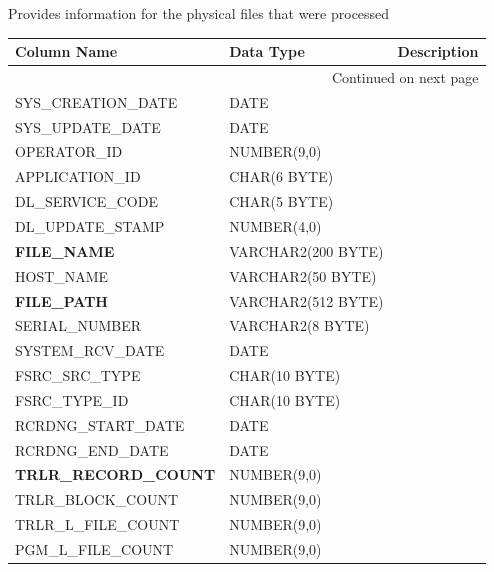 \documentclass[12pt,twoside]{article}
\begin{document}
    Provides information for the physical files that were processed 
\scriptsize
\begin{longtable}{lll}

\hline
 \textbf{Column Name}          &  \textbf{Data Type}  &  Description \\
\hline
\endhead
\hline\multicolumn{3}{r}{Continued on next page}\
\endfoot
\endlastfoot
 \textbf{IDENTIFIER}           &  NUMBER(15,0)        &               \\
 SYS\_CREATION\_DATE           &  DATE                &               \\
 SYS\_UPDATE\_DATE             &  DATE                &               \\
 OPERATOR\_ID                  &  NUMBER(9,0)         &               \\
 APPLICATION\_ID               &  CHAR(6 BYTE)        &               \\
 DL\_SERVICE\_CODE             &  CHAR(5 BYTE)        &               \\
 DL\_UPDATE\_STAMP             &  NUMBER(4,0)         &               \\
 \textbf{FILE\_NAME}           &  VARCHAR2(200 BYTE)  &               \\
 HOST\_NAME                    &  VARCHAR2(50 BYTE)   &               \\
 \textbf{FILE\_PATH}           &  VARCHAR2(512 BYTE)  &               \\
 SERIAL\_NUMBER                &  VARCHAR2(8 BYTE)    &               \\
 SYSTEM\_RCV\_DATE             &  DATE                &               \\
 FSRC\_SRC\_TYPE               &  CHAR(10 BYTE)       &               \\
 FSRC\_TYPE\_ID                &  CHAR(10 BYTE)       &               \\
 RCRDNG\_START\_DATE           &  DATE                &               \\
 RCRDNG\_END\_DATE             &  DATE                &               \\
 \textbf{TRLR\_RECORD\_COUNT}  &  NUMBER(9,0)         &               \\
 TRLR\_BLOCK\_COUNT            &  NUMBER(9,0)         &               \\
 TRLR\_L\_FILE\_COUNT          &  NUMBER(9,0)         &               \\
 PGM\_L\_FILE\_COUNT           &  NUMBER(9,0)         &               \\

\end{longtable}
\end{document}
